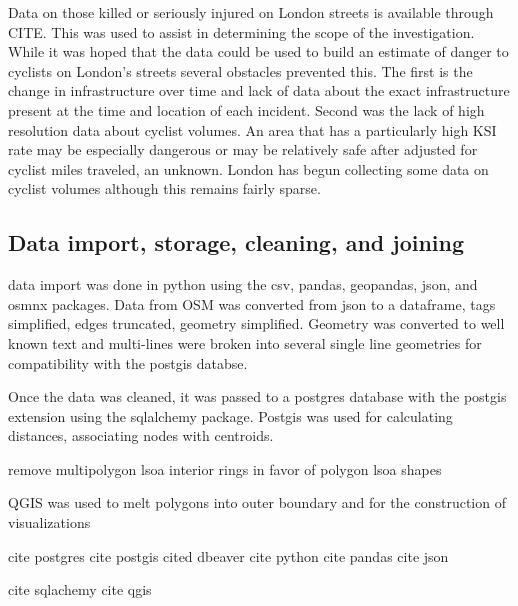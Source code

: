 Data on those killed or seriously injured on London streets is available through CITE. This was used to assist in determining the scope of the investigation. While it was hoped that the data could be used to build an estimate of danger to cyclists on London's streets several obstacles prevented this. The first is the change in infrastructure over time and lack of data about the exact infrastructure present at the time and location of each incident. Second was the lack of high resolution data about cyclist volumes. An area that has a particularly high KSI rate may be especially dangerous or may be relatively safe after adjusted for cyclist miles traveled, an unknown. London has begun collecting some data on cyclist volumes although this remains fairly sparse. \cite{cyclistksi}
	
\subsection{Data import, storage, cleaning, and joining}

data import was done in python using the csv, pandas, geopandas, json, and osmnx packages. 
Data from OSM was converted from json to a dataframe, tags simplified, edges truncated, geometry simplified. 
Geometry was converted to well known text and multi-lines were broken into several single line geometries for compatibility with the postgis databse. 

Once the data was cleaned, it was passed to a postgres database with the postgis extension using the sqlalchemy package. Postgis was used for calculating distances, associating nodes with centroids. 

remove multipolygon lsoa interior rings in favor of polygon lsoa shapes

QGIS was used to melt polygons into outer boundary and for the construction of visualizations

cite postgres
\cite{postgres}
cite postgis
\cite{postgis}
cited dbeaver
\cite{dbeaver}
cite python
\cite{python}
cite pandas
\cite{pandas}
cite json

cite sqlachemy
\cite{bayer2010sqlalchemy}
cite qgis
\cite{qgis}